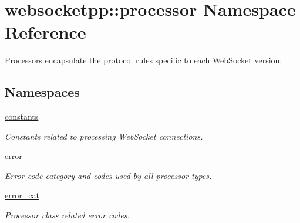 \hypertarget{namespacewebsocketpp_1_1processor}{}\section{websocketpp\+:\+:processor Namespace Reference}
\label{namespacewebsocketpp_1_1processor}


Processors encapsulate the protocol rules specific to each Web\+Socket version.  


\subsection*{Namespaces}
\begin{DoxyCompactItemize}
\item 
 \hyperlink{namespacewebsocketpp_1_1processor_1_1constants}{constants}
\begin{DoxyCompactList}\small\item\em Constants related to processing Web\+Socket connections. \end{DoxyCompactList}\item 
 \hyperlink{namespacewebsocketpp_1_1processor_1_1error}{error}
\begin{DoxyCompactList}\small\item\em Error code category and codes used by all processor types. \end{DoxyCompactList}\item 
 \hyperlink{namespacewebsocketpp_1_1processor_1_1error__cat}{error\+\_\+cat}
\begin{DoxyCompactList}\small\item\em Processor class related error codes. \end{DoxyCompactList}\end{DoxyCompactItemize}
